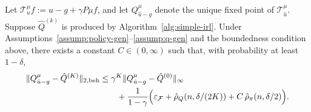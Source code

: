 \begin{lemma}
\label{lem:fqe-bound}
Let \(\mathcal T^\mu_u f := u-g+\gamma P\mu f\), and let
\(Q^\mu_{\hat u-g}\) denote the unique fixed point of
\(\mathcal T^\mu_{\hat u}\). Suppose \(\hat Q^{(k)}\) is produced by
Algorithm~\ref{alg:simple-irl}. Under
Assumptions~\ref{assump:policy-gen}--\ref{assump:q-gen} and the boundedness
condition above, there exists a constant \(C\in(0,\infty)\) such that, with
probability at least \(1-\delta\),
\begin{align*}
\|Q^\mu_{\hat u-g}-\hat Q^{(K)}\|_{2,\mathrm{beh}}
&\le
\gamma^K\|Q^\mu_{\hat u-g}-\hat Q^{(0)}\|_{\infty}\\
&\qquad+
\frac{1}{1-\gamma}
\Bigl(
\varepsilon_{\mathcal F}
+\hat\rho_Q(n,\delta/(2K))
+ C\,\hat\rho_\pi(n,\delta/2)
\Bigr).
\end{align*}
\end{lemma}


